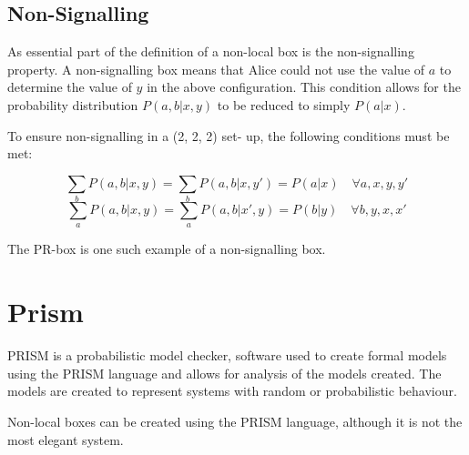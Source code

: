 \documentclass[report.tex]{subfiles}
\begin{document}
\subsection{Non-Signalling} %
\label{sub:non_signalling}
As essential part of the definition of a non-local box is the non-signalling
property. A non-signalling box means that Alice could not use the value of \(a\)
to determine the value of \(y\) in the above configuration. This condition
allows for the probability distribution \(P(a, b | x, y)\) to be reduced to
simply \(P(a|x)\).

To ensure non-signalling in a (2, 2, 2) set- up, the following conditions must
be met:

\[\sum_{b} P(a, b | x, y) = \sum_{b} P(a, b | x, y') = P(a | x) 
\quad \forall a, x, y, y'\]
\[\sum_{a} P(a, b | x, y) = \sum_{a} P(a, b | x', y) = P(b | y) 
\quad \forall b, y, x, x'\]

The PR-box is one such example of a non-signalling box.


\section{Prism} %
\label{sec:prism}
PRISM is a probabilistic model checker, software used to create formal models
using the PRISM language and allows for analysis of the models created. The
models are created to represent systems with random or probabilistic behaviour.

Non-local boxes can be created using the PRISM language, although it is not the
most elegant system.

\newpage
\end{document}
